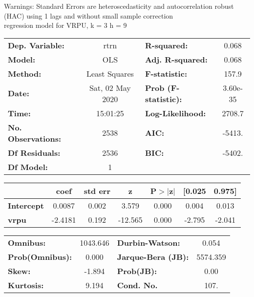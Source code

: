 Warnings: \newline
 [1] Standard Errors are heteroscedasticity and autocorrelation robust (HAC) using 1 lags and without small sample correction\\ 

regression model for VRPU, k = 3 h = 9\begin{center}
\begin{tabular}{lclc}
\toprule
\textbf{Dep. Variable:}    &       rtrn       & \textbf{  R-squared:         } &     0.068   \\
\textbf{Model:}            &       OLS        & \textbf{  Adj. R-squared:    } &     0.068   \\
\textbf{Method:}           &  Least Squares   & \textbf{  F-statistic:       } &     157.9   \\
\textbf{Date:}             & Sat, 02 May 2020 & \textbf{  Prob (F-statistic):} &  3.60e-35   \\
\textbf{Time:}             &     15:01:25     & \textbf{  Log-Likelihood:    } &    2708.7   \\
\textbf{No. Observations:} &        2538      & \textbf{  AIC:               } &    -5413.   \\
\textbf{Df Residuals:}     &        2536      & \textbf{  BIC:               } &    -5402.   \\
\textbf{Df Model:}         &           1      & \textbf{                     } &             \\
\bottomrule
\end{tabular}
\begin{tabular}{lcccccc}
                   & \textbf{coef} & \textbf{std err} & \textbf{z} & \textbf{P$> |$z$|$} & \textbf{[0.025} & \textbf{0.975]}  \\
\midrule
\textbf{Intercept} &       0.0087  &        0.002     &     3.579  &         0.000        &        0.004    &        0.013     \\
\textbf{vrpu}      &      -2.4181  &        0.192     &   -12.565  &         0.000        &       -2.795    &       -2.041     \\
\bottomrule
\end{tabular}
\begin{tabular}{lclc}
\textbf{Omnibus:}       & 1043.646 & \textbf{  Durbin-Watson:     } &    0.054  \\
\textbf{Prob(Omnibus):} &   0.000  & \textbf{  Jarque-Bera (JB):  } & 5574.359  \\
\textbf{Skew:}          &  -1.894  & \textbf{  Prob(JB):          } &     0.00  \\
\textbf{Kurtosis:}      &   9.194  & \textbf{  Cond. No.          } &     107.  \\
\bottomrule
\end{tabular}
\end{center}

